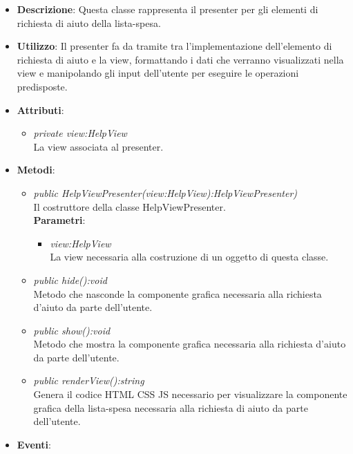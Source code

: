 \begin{itemize}
\item \textbf{Descrizione}: Questa classe rappresenta il presenter per gli elementi di richiesta di aiuto della lista-spesa.
\item \textbf{Utilizzo}: Il presenter fa da tramite tra l'implementazione dell'elemento di richiesta di aiuto e la view, formattando i dati che verranno visualizzati nella view e manipolando gli input dell'utente per eseguire le operazioni predisposte.
\item \textbf{Attributi}:
	\begin{itemize}
	\item \textit{private view:HelpView}\\
	La view associata al presenter.
	\end{itemize}
\item \textbf{Metodi}:
	\begin{itemize}
	\item \textit{public HelpViewPresenter(view:HelpView):HelpViewPresenter)}\\
	Il costruttore della classe HelpViewPresenter.
			\\ \textbf{Parametri}: \begin{itemize}
			\item \textit{view:HelpView}\\
			La view necessaria alla costruzione di un oggetto di questa classe.
			\end{itemize} 
	\item \textit{public hide():void}\\
	Metodo che nasconde la componente grafica necessaria alla richiesta d'aiuto da parte dell'utente.
	\item \textit{public show():void}\\
	Metodo che mostra la componente grafica necessaria alla richiesta d'aiuto da parte dell'utente.
	\item \textit{public renderView():string}\\
	Genera il codice HTML CSS JS necessario per visualizzare la componente grafica della lista-spesa necessaria alla richiesta di aiuto da parte dell'utente.
	\end{itemize}
\item \textbf{Eventi}:
\end{itemize}